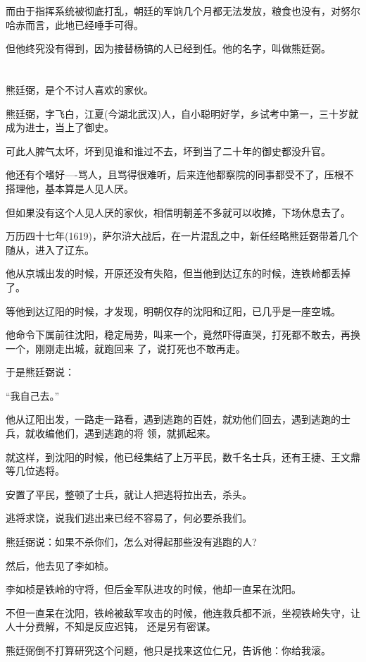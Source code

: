 \documentclass[11pt,a4paper,onecolumn]{article}
\begin{document}
而由于指挥系统被彻底打乱，朝廷的军饷几个月都无法发放，粮食也没有，对努尔哈赤而言，此地已经唾手可得。

但他终究没有得到，因为接替杨镐的人已经到任。他的名字，叫做熊廷弼。

\section[\thesection]{}

熊廷弼，是个不讨人喜欢的家伙。

熊廷弼，字飞白，江夏(今湖北武汉)人，自小聪明好学，乡试考中第一，三十岁就成为进士，当上了御史。

可此人脾气太坏，坏到见谁和谁过不去，坏到当了二十年的御史都没升官。

他还有个嗜好----骂人，且骂得很难听，后来连他都察院的同事都受不了，压根不搭理他，基本算是人见人厌。

但如果没有这个人见人厌的家伙，相信明朝差不多就可以收摊，下场休息去了。

万历四十七年(1619)，萨尔浒大战后，在一片混乱之中，新任经略熊廷弼带着几个随从，进入了辽东。

他从京城出发的时候，开原还没有失陷，但当他到达辽东的时候，连铁岭都丢掉了。

等他到达辽阳的时候，才发现，明朝仅存的沈阳和辽阳，已几乎是一座空城。

他命令下属前往沈阳，稳定局势，叫来一个，竟然吓得直哭，打死都不敢去，再换一个，刚刚走出城，就跑回来
了，说打死也不敢再走。

于是熊廷弼说：

``我自己去。''

他从辽阳出发，一路走一路看，遇到逃跑的百姓，就劝他们回去，遇到逃跑的士兵，就收编他们，遇到逃跑的将
领，就抓起来。

就这样，到沈阳的时候，他已经集结了上万平民，数千名士兵，还有王捷、王文鼎等几位逃将。

安置了平民，整顿了士兵，就让人把逃将拉出去，杀头。

逃将求饶，说我们逃出来已经不容易了，何必要杀我们。

熊廷弼说：如果不杀你们，怎么对得起那些没有逃跑的人?

然后，他去见了李如桢。

李如桢是铁岭的守将，但后金军队进攻的时候，他却一直呆在沈阳。

不但一直呆在沈阳，铁岭被敌军攻击的时候，他连救兵都不派，坐视铁岭失守，让人十分费解，不知是反应迟钝，
还是另有密谋。

熊廷弼倒不打算研究这个问题，他只是找来这位仁兄，告诉他：你给我滚。
\end{document}
